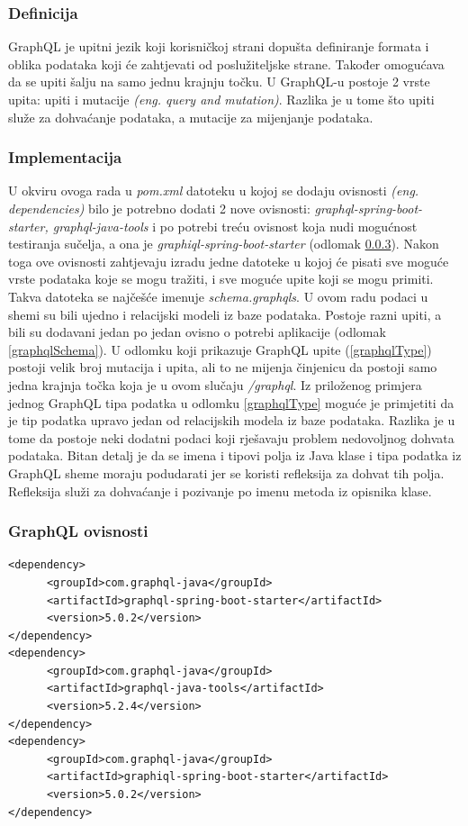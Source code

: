 \documentclass[times, utf8, zavrsni]{fer}
\begin{document}
\subsubsection{Definicija}
GraphQL je upitni jezik koji korisničkoj strani
dopušta definiranje formata i oblika podataka koji će zahtjevati od poslužiteljske strane. Također omogućava
da se upiti šalju na samo jednu krajnju točku. U GraphQL-u postoje 2 vrste upita:
upiti i mutacije \textit{(eng. query and mutation)}. Razlika je u tome što upiti služe za dohvaćanje podataka,
a mutacije za mijenjanje podataka.

\subsubsection{Implementacija}
U okviru ovoga rada u \textit{pom.xml} datoteku u kojoj se dodaju ovisnosti \textit{(eng. dependencies)}
bilo je potrebno dodati 2 nove ovisnosti: \textit{graphql-spring-boot-starter, graphql-java-tools}
i po potrebi treću ovisnost koja nudi mogućnost testiranja sučelja,
a ona je \textit{graphiql-spring-boot-starter} (odlomak \ref{graphqlDependecies}). Nakon toga ove ovisnosti zahtjevaju
izradu jedne datoteke u kojoj će pisati sve moguće vrste podataka koje se mogu tražiti, i sve
moguće upite koji se mogu primiti. Takva datoteka se najčešće imenuje \textit{schema.graphqls}.
U ovom radu podaci u shemi su bili ujedno i relacijski modeli iz baze podataka.
Postoje razni upiti, a bili su dodavani jedan po jedan ovisno o potrebi aplikacije (odlomak \ref{graphqlSchema}).
U odlomku koji prikazuje GraphQL upite (\ref{graphqlType})
postoji velik broj mutacija i upita, ali to ne mijenja činjenicu da postoji
samo jedna krajnja točka koja je u ovom slučaju \textit{/graphql}. Iz priloženog primjera jednog GraphQL tipa podatka u odlomku \ref{graphqlType}
moguće je primjetiti da je tip podatka upravo jedan od relacijskih modela iz baze podataka. Razlika je u tome da postoje neki dodatni podaci
koji rješavaju problem nedovoljnog dohvata podataka. Bitan detalj je da se imena i tipovi polja iz Java klase i tipa podatka iz
GraphQL sheme moraju podudarati jer se koristi refleksija za dohvat tih polja. Refleksija služi za dohvaćanje i pozivanje po imenu
metoda iz opisnika klase.
\newpage
\subsubsection{GraphQL ovisnosti}
\label{graphqlDependecies}
\begin{Verbatim}[fontsize=\scriptsize]
<dependency>
      <groupId>com.graphql-java</groupId>
      <artifactId>graphql-spring-boot-starter</artifactId>
      <version>5.0.2</version>
</dependency>
<dependency>
      <groupId>com.graphql-java</groupId>
      <artifactId>graphql-java-tools</artifactId>
      <version>5.2.4</version>
</dependency>
<dependency>
      <groupId>com.graphql-java</groupId>
      <artifactId>graphiql-spring-boot-starter</artifactId>
      <version>5.0.2</version>
</dependency>
\end{Verbatim}
\end{document}
